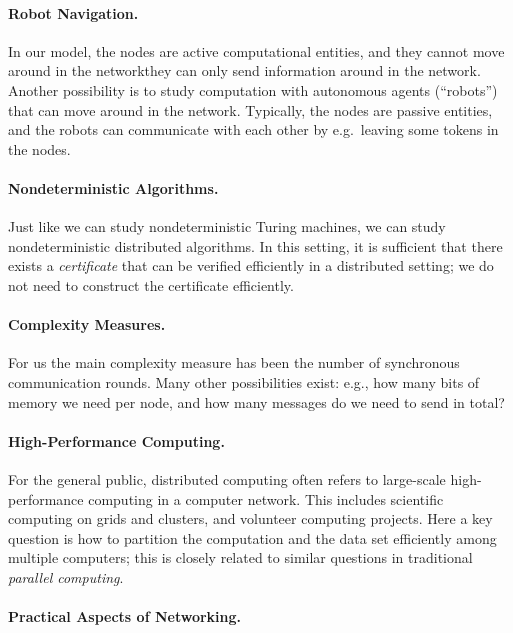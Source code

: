 \paragraph{Robot Navigation.}

In our model, the nodes are active computational entities, and they cannot move around in the network\mydash they can only send information around in the network. Another possibility is to study computation with autonomous agents (``robots'') that can move around in the network. Typically, the nodes are passive entities, and the robots can communicate with each other by e.g.\ leaving some tokens in the nodes.


\paragraph{Nondeterministic Algorithms.}

Just like we can study nondeterministic Turing machines, we can study nondeterministic distributed algorithms. In this setting, it is sufficient that there exists a \emph{certificate} that can be verified efficiently in a distributed setting; we do not need to construct the certificate efficiently.


\paragraph{Complexity Measures.}

For us the main complexity measure has been the number of synchronous communication rounds. Many other possibilities exist: e.g., how many bits of memory we need per node, and how many messages do we need to send in total?


\paragraph{High-Performance Computing.}

For the general public, distributed computing often refers to large-scale high-performance computing in a computer network. This includes scientific computing on grids and clusters, and volunteer computing projects. Here a key question is how to partition the computation and the data set efficiently among multiple computers; this is closely related to similar questions in traditional \emph{parallel computing}.


\paragraph{Practical Aspects of Networking.}

